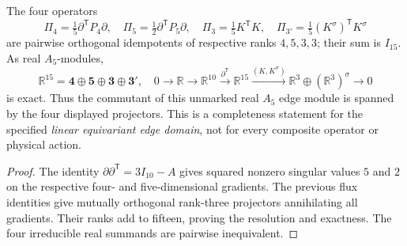 \documentclass[11pt]{article}
\begin{document}
\begin{theorem}
\label{p1:thm:petersen-fifteen-resolution}
The four operators
\[
 \Pi_4=\tfrac15\partial^{\mathsf T}P_4\partial,\quad
 \Pi_5=\tfrac12\partial^{\mathsf T}P_5\partial,\quad
 \Pi_3=\tfrac15K^{\mathsf T}K,\quad
 \Pi_{3'}=\tfrac15(K^\sigma)^{\mathsf T}K^\sigma
\]
are pairwise orthogonal idempotents of respective ranks $4,5,3,3$;
their sum is $I_{15}$. As real $A_5$-modules,
\[
 \boxed{\mathbb R^{15}=\mathbf4\oplus\mathbf5\oplus\mathbf3\oplus\mathbf3',}
\quad
 0\longrightarrow\mathbb R\longrightarrow\mathbb R^{10}
 \xrightarrow{\partial^{\mathsf T}}\mathbb R^{15}
 \xrightarrow{(K,K^\sigma)}\mathbb R^3\oplus(\mathbb R^3)^\sigma
 \longrightarrow0
\]
is exact. Thus the commutant of this unmarked real $A_5$ edge module
is spanned by the four displayed projectors. This is a completeness
statement for the specified \emph{linear equivariant edge domain}, not
for every composite operator or physical action.
\end{theorem}
\begin{proof}
The identity $\partial\partial^{\mathsf T}=3I_{10}-A$ gives
squared nonzero singular values $5$ and $2$ on the respective
four- and five-dimensional gradients. The previous flux identities
give mutually orthogonal rank-three projectors annihilating all
gradients. Their ranks add to fifteen, proving the resolution and
exactness. The four irreducible real summands are pairwise inequivalent.
\end{proof}
\end{document}
